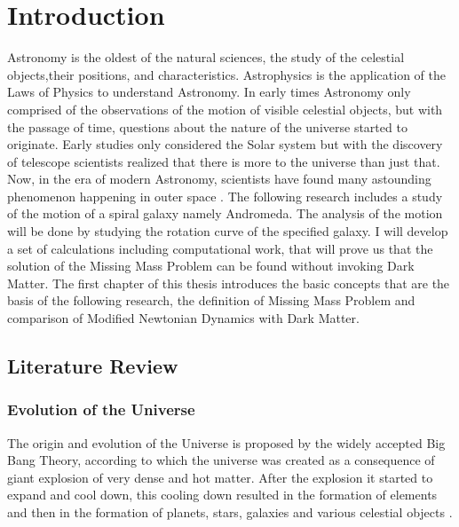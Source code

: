 \chapter{Introduction}

Astronomy is the oldest of the natural sciences, the study of the celestial objects,their positions, and characteristics. Astrophysics is the application of the Laws of Physics to understand Astronomy. In early times Astronomy only comprised of the observations of the motion of visible celestial objects, but with the passage of time, questions about the nature of the universe started to originate. Early studies only considered the Solar system but with the discovery of telescope scientists realized that there is more to the universe than just that. Now, in the era of modern Astronomy, scientists have found many astounding phenomenon happening in outer space \cite{introduction}.
The following research includes a study of the motion of a spiral galaxy namely Andromeda. The analysis of the motion will be done by studying the rotation curve of the specified galaxy. I will develop a set of calculations including computational work, that will prove us that the solution of the Missing Mass Problem can be found without invoking Dark Matter.
The first chapter of this thesis introduces the basic concepts that are the basis of the following research, the definition of Missing Mass Problem and comparison of Modified Newtonian Dynamics with Dark Matter.

\section{Literature Review}

\subsection{Evolution of the Universe}
 The origin and evolution of the Universe is proposed by the widely accepted Big Bang Theory, according to which the universe was created as a consequence of giant explosion of very dense and hot matter. After the explosion it started to expand and cool down, this cooling down resulted in the formation of elements and then in the formation of planets, stars, galaxies and various celestial objects \cite{evolution}.

